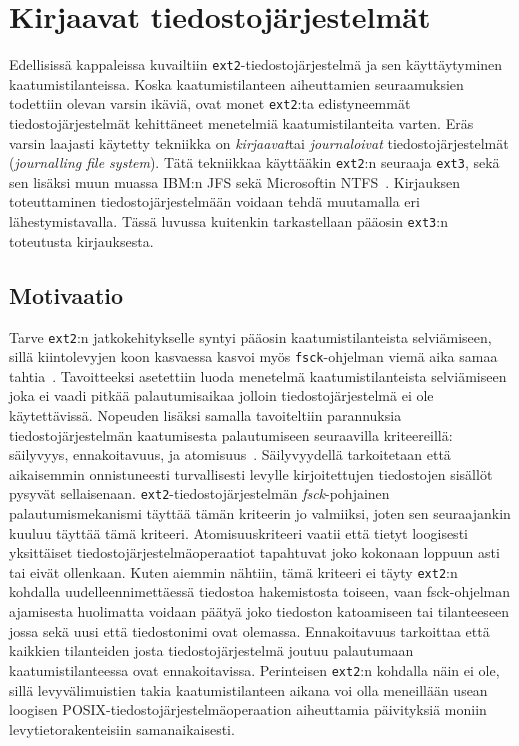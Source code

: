 \section{Kirjaavat tiedostojärjestelmät}
\label{ChapJournallingFs}
Edellisissä kappaleissa kuvailtiin \texttt{ext2}-tiedostojärjestelmä ja sen käyttäytyminen kaatumistilanteissa.
Koska kaatumistilanteen aiheuttamien seuraamuksien todettiin olevan varsin ikäviä,
ovat monet \texttt{ext2}:ta edistyneemmät tiedostojärjestelmät kehittäneet menetelmiä kaatumistilanteita varten.
Eräs varsin laajasti käytetty tekniikka on \emph{kirjaavat}tai \emph{journaloivat} tiedostojärjestelmät (\emph{journalling file system}).
Tätä tekniikkaa käyttääkin \texttt{ext2}:n seuraaja \texttt{ext3}, sekä sen lisäksi
muun muassa IBM:n JFS sekä Microsoftin NTFS~\cite{JournalingAnalysis}.
Kirjauksen toteuttaminen tiedostojärjestelmään voidaan tehdä muutamalla eri lähestymistavalla.
Tässä luvussa kuitenkin tarkastellaan pääosin \texttt{ext3}:n toteutusta kirjauksesta.

\subsection{Motivaatio}

Tarve \texttt{ext2}:n jatkokehitykselle syntyi pääosin kaatumistilanteista selviämiseen,
sillä kiintolevyjen koon kasvaessa kasvoi myös \texttt{fsck}-ohjelman viemä aika samaa tahtia~\cite{Ext2Journal}.
Tavoitteeksi asetettiin luoda menetelmä kaatumistilanteista selviämiseen joka ei vaadi pitkää palautumisaikaa jolloin tiedostojärjestelmä ei ole käytettävissä.
Nopeuden lisäksi samalla tavoiteltiin parannuksia tiedostojärjestelmän kaatumisesta palautumiseen seuraavilla kriteereillä: säilyvyys, ennakoitavuus, ja atomisuus~\cite{Ext2Journal}.
Säilyvyydellä tarkoitetaan että aikaisemmin onnistuneesti turvallisesti levylle kirjoitettujen tiedostojen sisällöt pysyvät sellaisenaan.
\texttt{ext2}-tiedostojärjestelmän \emph{fsck}-pohjainen palautumismekanismi täyttää tämän kriteerin jo valmiiksi,
joten sen seuraajankin kuuluu täyttää tämä kriteeri.
Atomisuuskriteeri vaatii että tietyt loogisesti yksittäiset tiedostojärjestelmäoperaatiot tapahtuvat
joko kokonaan loppuun asti tai eivät ollenkaan.
Kuten aiemmin nähtiin, tämä kriteeri ei täyty \texttt{ext2}:n kohdalla uudelleennimettäessä tiedostoa hakemistosta toiseen,
vaan fsck-ohjelman ajamisesta huolimatta voidaan päätyä joko tiedoston katoamiseen tai tilanteeseen jossa sekä uusi että tiedostonimi ovat olemassa.
Ennakoitavuus tarkoittaa että kaikkien tilanteiden josta tiedostojärjestelmä joutuu palautumaan kaatumistilanteessa ovat ennakoitavissa.
Perinteisen \texttt{ext2}:n kohdalla näin ei ole,
sillä levyvälimuistien takia kaatumistilanteen aikana voi olla meneillään usean loogisen POSIX-tiedostojärjestelmäoperaation aiheuttamia päivityksiä moniin levytietorakenteisiin samanaikaisesti.

